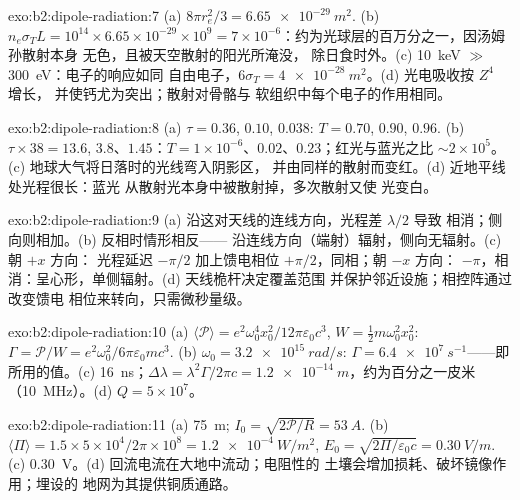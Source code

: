 \begin{solution}{exo:b2:dipole-radiation:7}
(a) $8\pi r_e^2/3 = \qty{6.65e-29}{m^2}$. (b) $n_e\sigma_TL = 10^{14} \times 6.65 \times 10^{-29}
\times 10^9 = 7 \times 10^{-6}$：约为光球层的百万分之一，因汤姆孙散射本身
无色，且被天空散射的阳光所淹没，
除日食时外。(c) \qty{10}{keV} $\gg$ \qty{300}{eV}：电子的响应如同
自由电子，$6\sigma_T = \qty{4e-28}{m^2}$。(d) 光电吸收按 $Z^4$ 增长，
并使钙尤为突出；散射对骨骼与
软组织中每个电子的作用相同。
\end{solution}

\begin{solution}{exo:b2:dipole-radiation:8}
(a) $\tau = 0.36$, $0.10$, $0.038$: $T = 0.70$, $0.90$, $0.96$. (b) $\tau \times 38 = 13.6$,
$3.8$、$1.45$：$T = 1 \times 10^{-6}$、$0.02$、$0.23$；红光与蓝光之比 $\sim 2 \times 10^5$。(c)
地球大气将日落时的光线弯入阴影区，
并由同样的散射而变红。(d) 近地平线处光程很长：蓝光
从散射光本身中被散射掉，多次散射又使
光变白。
\end{solution}

\begin{solution}{exo:b2:dipole-radiation:9}
(a) 沿这对天线的连线方向，光程差 $\lambda/2$ 导致
相消；侧向则相加。(b) 反相时情形相反——
沿连线方向（端射）辐射，侧向无辐射。(c) 朝 $+x$ 方向：
光程延迟 $-\pi/2$ 加上馈电相位 $+\pi/2$，同相；朝 $-x$ 方向：
$-\pi$，相消：呈心形，单侧辐射。(d) 天线桅杆决定覆盖范围
并保护邻近设施；相控阵通过改变馈电
相位来转向，只需微秒量级。
\end{solution}

\begin{solution}{exo:b2:dipole-radiation:10}
(a) $\langle\mathcal P\rangle = e^2\omega_0^4x_0^2/12\pi\varepsilon_0c^3$, $W = \tfrac12m\omega_0^2x_0^2$:
$\Gamma = \mathcal P/W = e^2\omega_0^2/6\pi\varepsilon_0mc^3$. (b) $\omega_0 = \qty{3.2e15}{rad/s}$: $\Gamma =
\qty{6.4e7}{s^{-1}}$——即所用的值。(c) \qty{16}{ns}；$\Delta\lambda = \lambda^2\Gamma/2\pi c =
\qty{1.2e-14}{m}$，约为百分之一皮米（\qty{10}{MHz}）。(d) $Q = 5 \times 10^7$。
\end{solution}

\begin{solution}{exo:b2:dipole-radiation:11}
(a) \qty{75}{m}; $I_0 = \sqrt{2\mathcal P/R} = \qty{53}{A}$. (b) $\langle\Pi\rangle = 1.5 \times
5 \times 10^4/2\pi \times 10^8 = \qty{1.2e-4}{W/m^2}$, $E_0 = \sqrt{2\Pi/\varepsilon_0c} = \qty{0.30}{V/m}$.
(c) \qty{0.30}{V}。(d) 回流电流在大地中流动；电阻性的
土壤会增加损耗、破坏镜像作用；埋设的
地网为其提供铜质通路。
\end{solution}

